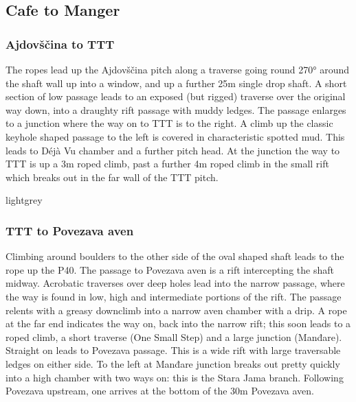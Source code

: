 \hypertarget{cafe-to-manger}{%
\subsection{Cafe to Manger}\label{cafe-to-manger}}

\hypertarget{ajdovux161ux10dina-to-ttt}{%
\subsubsection{Ajdovščina to TTT}\label{ajdovux161ux10dina-to-ttt}}

The ropes lead up the Ajdovščina pitch along a traverse going round 270° around the shaft wall up into a window, and up a further 25m single drop shaft. A short section of low passage leads to an exposed (but rigged) traverse over the original way down, into a draughty rift passage with muddy ledges. The passage enlarges to a junction where the way on to TTT is to the right. A climb up the classic keyhole shaped passage to the left is covered in characteristic spotted mud. This leads to Déjà Vu chamber and a further pitch head. At the junction the way to TTT is up a 3m roped climb, past a further 4m roped climb in the small rift which breaks out in the far wall of the TTT pitch.

\begin{colourarticle}{lightgrey}
\end{colourarticle}


\hypertarget{ttt-to-povezava-aven}{%
\subsubsection{TTT to Povezava aven}\label{ttt-to-povezava-aven}}

Climbing around boulders to the other side of the oval shaped shaft leads to the rope up the P40. The passage to Povezava aven is a rift intercepting the shaft midway. Acrobatic traverses over deep holes lead into the narrow passage, where the way is found in low, high and intermediate portions of the rift. The passage relents with a greasy downclimb into a narrow aven chamber with a drip. A rope at the far end indicates the way on, back into the narrow rift; this soon leads to a roped climb, a short traverse (One Small Step) and a large junction (Manđare). Straight on leads to Povezava passage. This is a wide rift with large traversable ledges on either side. To the left at Manđare junction breaks out pretty quickly into a high chamber with two ways on: this is the Stara Jama branch. Following Povezava upstream, one arrives at the bottom of the 30m Povezava aven.

